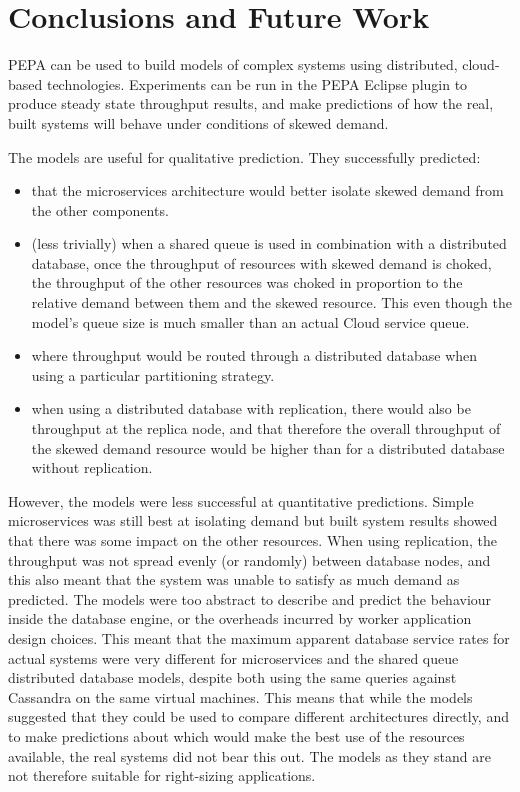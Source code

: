 %
%

\section{Conclusions and Future Work}\label{sec:conclusions}
PEPA can be used to build models of complex systems using distributed, cloud-based technologies.  Experiments can be run in the PEPA Eclipse plugin to produce steady state throughput results, and make predictions of how the real, built systems will behave under conditions of skewed demand.
	
The models are useful for qualitative prediction.  They successfully predicted:
\begin{itemize}
	\item that the microservices architecture would better isolate skewed demand from the other components.
	\item (less trivially) when a shared queue is used in combination with a distributed database, once the throughput of resources with skewed demand is choked, the throughput of the other resources was choked in proportion to the relative demand between them and the skewed resource.  This even though the model's queue size is much smaller than an actual Cloud service queue.
	\item where throughput would be routed through a distributed database when using a particular partitioning strategy.
	\item when using a distributed database with replication, there would also be throughput at the replica node, and that therefore the overall throughput of the skewed demand resource would be higher than for a distributed database without replication.
\end{itemize}

However, the models were less successful at quantitative predictions.  Simple microservices was still best at isolating demand but built system results showed that there was some impact on the other resources.  When using replication, the throughput was not spread evenly (or randomly) between database nodes, and this also meant that the system was unable to satisfy as much demand as predicted.  The models were too abstract to describe and predict the behaviour inside the database engine, or the overheads incurred by worker application design choices.  This meant that the maximum apparent database service rates for actual systems were very different for microservices and the shared queue distributed database models, despite both using the same queries against Cassandra on the same virtual machines.  This means that while the models suggested that they could be used to compare different architectures directly, and to make predictions about which would make the best use of the resources available, the real systems did not bear this out.  The models as they stand are not therefore suitable for right-sizing applications.

